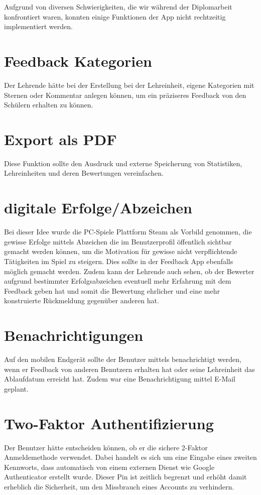 Aufgrund von diversen Schwierigkeiten, die wir während der Diplomarbeit konfrontiert waren, konnten einige 
Funktionen der App nicht rechtzeitig implementiert werden.

\section{Feedback Kategorien}
\author{Stefano Pyringer}
Der Lehrende hätte bei der Erstellung bei der Lehreinheit, eigene Kategorien mit Sternen oder Kommentar anlegen können, 
um ein präziseres Feedback von den Schülern erhalten zu können. 

\section{Export als PDF}
\author{Stefano Pyringer}
Diese Funktion sollte den Ausdruck und externe Speicherung von Statistiken, Lehreinheiten und deren Bewertungen vereinfachen.

\section{digitale Erfolge/Abzeichen}
\author{Stefano Pyringer}
Bei dieser Idee wurde die PC-Spiele Plattform Steam als Vorbild genommen, die gewisse Erfolge mittels Abzeichen die im Benutzerprofil öffentlich
sichtbar gemacht werden können, um die Motivation für gewisse nicht verpflichtende Tätigkeiten im Spiel zu steigern. 
Dies sollte in der Feedback App ebenfalls möglich gemacht werden. Zudem kann der Lehrende auch sehen, ob der Bewerter aufgrund bestimmter Erfolgsabzeichen eventuell mehr Erfahrung 
mit dem Feedback geben hat und somit die Bewertung ehrlicher und eine mehr konstruierte Rückmeldung gegenüber anderen hat.

\section{Benachrichtigungen}
\author{Stefano Pyringer}
Auf den mobilen Endgerät sollte der Benutzer mittels benachrichtigt werden, wenn er Feedback von anderen Benutzern erhalten hat oder seine 
Lehreinheit das Ablaufdatum erreicht hat. Zudem war eine Benachrichtigung mittel E-Mail geplant.

\section{Two-Faktor Authentifizierung}
\author{Stefano Pyringer}
Der Benutzer hätte entscheiden können, ob er die sichere 2-Faktor Anmeldemethode verwendet. Dabei handelt es sich um eine 
Eingabe eines zweiten Kennworts, dass automatisch von einem externen Dienst wie Google Authenticator erstellt wurde. 
Dieser Pin ist zeitlich begrenzt und erhöht damit erheblich die Sicherheit, um den Missbrauch eines Accounts zu verhindern.

